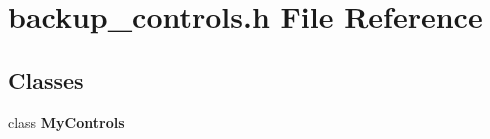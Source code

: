 \section{backup\_\-controls.h File Reference}
\label{backup__controls_8h}
\subsection*{Classes}
\begin{CompactItemize}
\item 
class {\bf My\-Controls}
\end{CompactItemize}
